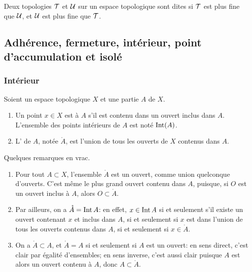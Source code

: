 \begin{definition}
  Deux topologies \( \mathcal{T} \) et \( \mathcal{U} \) sur un espace topologique sont dites  si  \( \mathcal{T} \) est plus fine que \( \mathcal{U} \), et  \( \mathcal{U} \) est plus fine que \( \mathcal{T} \).
\end{definition}

\subsection{Adhérence, fermeture, intérieur, point d'accumulation et isolé}

\subsubsection{Intérieur}

\begin{definition}      \label{DEFooSVWMooLpAVZRInt}
    Soient un espace topologique \( X\) et une partie \( A\) de \( X\).
    \begin{enumerate}
        \item
            Un point \( x\in X\) est  à \( A\) s'il est contenu dans un ouvert inclus dans \( A\). L'ensemble des points intérieurs de \( A\) est noté $\operatorname{Int}(A)$.
        \item
            L' de \( A\), notée \( \mathring A\), est l'union de tous les ouverts de \( X\) contenus dans \( A\).
    \end{enumerate}
\end{definition}
\begin{remark}\label{RemIntOuvert}
Quelques remarques en vrac.
\begin{enumerate}
\item Pour tout \( A \subset X\), l'ensemble \( \mathring A\) est un ouvert, comme union quelconque d'ouverts. C'est même le plus grand ouvert contenu dans \( A \), puisque, si \( O \) est un ouvert inclus à \( A \), alors \( O \subset \mathring A\).

\item Par ailleurs, on a \( \mathring A = \operatorname{Int} A \): en effet, \( x \in \operatorname{Int} A \) si et seulement s'il existe un ouvert contenant \( x \) et inclus dans \( A \), si et seulement si \( x \) est dans l'union de tous les ouverts contenus dans \( A \), si et seulement si \( x \in \mathring A \).

\item On a  \( \mathring A \subset A \), et \( \mathring A = A \) si et seulement si $A$ est un ouvert: en sens direct, c'est clair par égalité d'ensembles; en sens inverse, c'est aussi clair puisque $A$ est alors un ouvert contenu à $A$, donc  \( A \subset \mathring A \).

\end{enumerate}
\end{remark}

